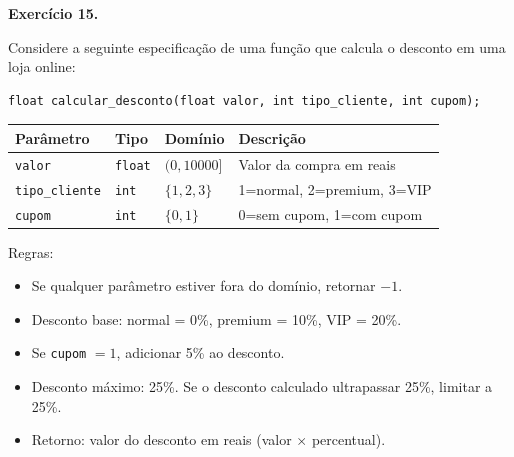 \documentclass[12pt,a4paper]{article}
\newif\ifgabarito
\newcommand{\questao}[2][8]{%
  \needspace{#1\baselineskip}%
  \noindent\textbf{Exercício #2.}%
}
\begin{document}
\ifgabarito
\begin{tcolorbox}[gabarito]
\begin{enumerate}[label=\alph*),nosep]
  \item Classes válidas: [0,12], [13,17], [18,64], [65,150]. Classes inválidas: $(-\infty,-1]$, $[151,+\infty)$.
  \item CTs representativos: 6 retorna ``criança''; 15 retorna ``adolescente''; 30 retorna ``adulto''; 100 retorna ``idoso''; $-5$ retorna ``inválido''; 200 retorna ``inválido''.
  \item Fronteiras e pares \textit{on}/\textit{off}: ($-1$/$0$); ($12$/$13$); ($17$/$18$); ($64$/$65$); ($150$/$151$). Total: 10 casos de teste de fronteira.
\end{enumerate}
\end{tcolorbox}
\fi

\vspace{8pt}

\questao[25]{15}
Considere a seguinte especificação de uma função que calcula o desconto em uma loja online:

\begin{lstlisting}[style=code, numbers=none]
float calcular_desconto(float valor, int tipo_cliente, int cupom);
\end{lstlisting}

\begin{center}
\small
\begin{tabular}{llll}
\toprule
\textbf{Parâmetro} & \textbf{Tipo} & \textbf{Domínio} & \textbf{Descrição} \\
\midrule
\texttt{valor} & \texttt{float} & $(0, 10000]$ & Valor da compra em reais \\
\texttt{tipo\_cliente} & \texttt{int} & $\{1, 2, 3\}$ & 1=normal, 2=premium, 3=VIP \\
\texttt{cupom} & \texttt{int} & $\{0, 1\}$ & 0=sem cupom, 1=com cupom \\
\bottomrule
\end{tabular}
\end{center}

Regras:
\begin{itemize}[nosep]
  \item Se qualquer parâmetro estiver fora do domínio, retornar $-1$.
  \item Desconto base: normal = 0\%, premium = 10\%, VIP = 20\%.
  \item Se \texttt{cupom} $= 1$, adicionar 5\% ao desconto.
  \item Desconto máximo: 25\%. Se o desconto calculado ultrapassar 25\%, limitar a 25\%.
  \item Retorno: valor do desconto em reais (valor $\times$ percentual).
\end{itemize}
\end{document}
